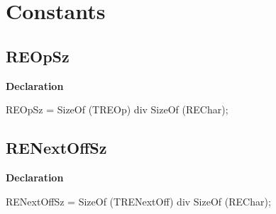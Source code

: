 \documentclass{report}
\newif\ifpdf
\begin{document}
\section{Constants}
\ifpdf
\subsection*{\large{\textbf{REOpSz}}\normalsize\hspace{1ex}\hrulefill}
\else
\subsection*{REOpSz}
\fi
\label{RegExpr-REOpSz}
\begin{list}{}{
\setlength{\itemindent}{0cm}
\setlength{\listparindent}{0cm}
\setlength{\leftmargin}{\evensidemargin}
\addtolength{\leftmargin}{\tmplength}
\settowidth{\labelsep}{X}
\addtolength{\leftmargin}{\labelsep}
\setlength{\labelwidth}{\tmplength}
}
\item[\textbf{Declaration}\hfill]
\ifpdf
\begin{flushleft}
\fi
\begin{ttfamily}
REOpSz = SizeOf (TREOp) div SizeOf (REChar);\end{ttfamily}

\ifpdf
\end{flushleft}
\fi

\end{list}
\ifpdf
\subsection*{\large{\textbf{RENextOffSz}}\normalsize\hspace{1ex}\hrulefill}
\else
\subsection*{RENextOffSz}
\fi
\label{RegExpr-RENextOffSz}
\begin{list}{}{
\setlength{\itemindent}{0cm}
\setlength{\listparindent}{0cm}
\setlength{\leftmargin}{\evensidemargin}
\addtolength{\leftmargin}{\tmplength}
\settowidth{\labelsep}{X}
\addtolength{\leftmargin}{\labelsep}
\setlength{\labelwidth}{\tmplength}
}
\item[\textbf{Declaration}\hfill]
\ifpdf
\begin{flushleft}
\fi
\begin{ttfamily}
RENextOffSz = SizeOf (TRENextOff) div SizeOf (REChar);\end{ttfamily}

\ifpdf
\end{flushleft}
\fi

\end{list}
\ifpdf
\end{document}
